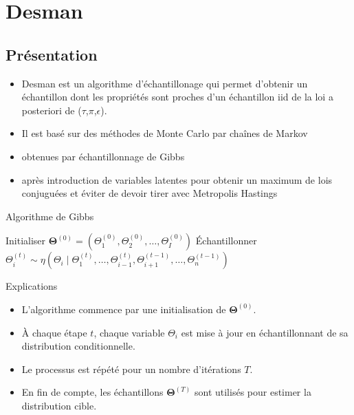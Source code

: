 \documentclass{beamer}
\begin{document}
\section{Desman}
\subsection{Présentation}
\begin{frame}
\begin{itemize}
\item Desman est un algorithme d'échantillonage qui permet d'obtenir un échantillon dont les propriétés sont proches d'un échantillon iid de la loi a posteriori de ($\tau$,$\pi$,$\epsilon$).
\item Il est basé sur des méthodes de Monte Carlo par chaînes de Markov
\item obtenues par échantillonnage de Gibbs
\item après introduction de variables latentes pour obtenir un maximum de lois conjuguées et éviter de devoir tirer avec Metropolis Hastings
\end{itemize}
\end{frame}
\begin{frame}{Algorithme de Gibbs}

    \begin{algorithm}[H]
        \caption{Algorithme de Gibbs}
        \begin{algorithmic}[1]
            \State Initialiser $\mathbf{\Theta}^{(0)} = (\Theta_1^{(0)}, \Theta_2^{(0)}, \ldots, \Theta_I^{(0)})$
                    \State Échantillonner 
                    \State \quad$\Theta_i^{(t)} \sim \eta\left(\Theta_i \mid \Theta_1^{(t)}, \ldots, \Theta_{i-1}^{(t)}, \Theta_{i+1}^{(t-1)}, \ldots, \Theta_n^{(t-1)}\right)$
                \EndFor
            \EndFor
        \end{algorithmic}
    \end{algorithm}
\end{frame}

\begin{frame}{Explications}
    \begin{itemize}
        \item L'algorithme commence par une initialisation de $\mathbf{\Theta}^{(0)}$.
        \item À chaque étape $t$, chaque variable $\Theta_i$ est mise à jour en échantillonnant de sa distribution conditionnelle.
        \item Le processus est répété pour un nombre d'itérations $T$.
        \item En fin de compte, les échantillons $\mathbf{\Theta}^{(T)}$ sont utilisés pour estimer la distribution cible.
    \end{itemize}
\end{frame}
\end{document}
